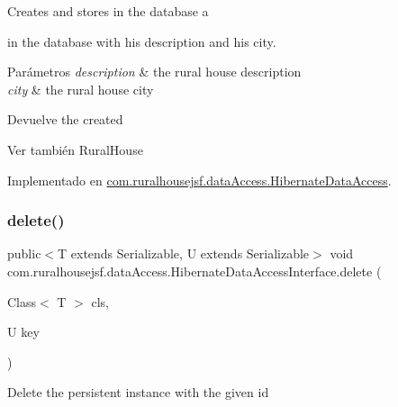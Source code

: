 Creates and stores in the database a
\begin{DoxyCode}{0}
\end{DoxyCode}
 in the database with his description and his city.


\begin{DoxyParams}{Parámetros}
{\em description} & the rural house description \\
\hline
{\em city} & the rural house city\\
\hline
\end{DoxyParams}
\begin{DoxyReturn}{Devuelve}
the created
\begin{DoxyCode}{0}
\end{DoxyCode}

\end{DoxyReturn}
\begin{DoxySeeAlso}{Ver también}
Rural\+House 
\end{DoxySeeAlso}


Implementado en \mbox{\hyperlink{classcom_1_1ruralhousejsf_1_1data_access_1_1_hibernate_data_access_a23eafc2c1f43052f2005a863d6592abc}{com.\+ruralhousejsf.\+data\+Access.\+Hibernate\+Data\+Access}}.

\mbox{\label{interfacecom_1_1ruralhousejsf_1_1data_access_1_1_hibernate_data_access_interface_a887957b637255d48878d157ee414027a}} 
\subsubsection{\texorpdfstring{delete()}{delete()}}
{\footnotesize\ttfamily public$<$T extends Serializable, U extends Serializable$>$ void com.\+ruralhousejsf.\+data\+Access.\+Hibernate\+Data\+Access\+Interface.\+delete (\begin{DoxyParamCaption}\item[{Class$<$ T $>$}]{cls,  }\item[{U}]{key }\end{DoxyParamCaption})}

Delete the persistent instance with the given id


